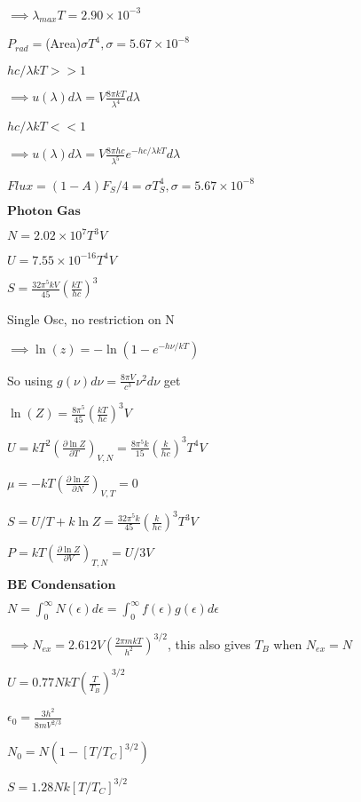 \documentclass{article}
\begin{document}
\begin{multicols}{3}
$\implies \lambda_{max}T=2.90 \times 10^{-3}$

$P_{rad}=$(Area)$\sigma T^4, \sigma=5.67\times 10^{-8}$

$hc/\lambda kT >> 1$

$\implies u(\lambda)d\lambda=V\frac{8\pi kT}{\lambda^4}d\lambda$

$hc/\lambda kT << 1$

$\implies u(\lambda)d\lambda=V\frac{8\pi hc}{\lambda^5}e^{-hc/\lambda kT}d\lambda$

$Flux=(1-A)F_S/4=\sigma T_S^4, \sigma=5.67\times 10^{-8}$

$\textbf{Photon Gas}$

$N=2.02\times 10^7 T^3 V$

$U=7.55\times 10^{-16}T^4V$

$S=\frac{32\pi^5 kV}{45}\left ( \frac{kT}{hc} \right ) ^3$

Single Osc, no restriction on N

$\implies \ln(z)=-\ln(1-e^{-h\nu / kT})$

So using $g(\nu)d\nu=\frac{8\pi V}{c^3}\nu^2 d\nu$ get

$\ln(Z)=\frac{8\pi^5}{45} \left ( \frac{kT}{hc} \right )^3 V$

$U=kT^2 \left( \frac{\partial \ln Z}{\partial T} \right)_{V,N}=\frac{8 \pi^5 k}{15}\left(\frac{k}{hc}\right)^3 T^4 V$

$\mu=-kT \left( \frac{\partial \ln Z}{\partial N} \right)_{V,T}=0$

$S=U/T+k \ln Z=\frac{32 \pi^5 k}{45}\left(\frac{k}{hc}\right)^3 T^3 V$

$P=kT \left( \frac{\partial \ln Z}{\partial V} \right)_{T,N}=U/3V$

$\textbf{BE Condensation}$

$N=\int_0^\infty N(\epsilon)d\epsilon = \int_0^\infty f(\epsilon)g(\epsilon)d\epsilon$

$\implies N_{ex}=2.612 V \left ( \frac{2\pi mkT}{h^2} \right )^{3/2}$, this also gives $T_B$ when $N_{ex}=N$

$U=0.77 NkT \left ( \frac{T}{T_B}  \right )^{3/2}$

$\epsilon_0=\frac{3h^2}{8mV^{2/3}}$

$N_0=N(1-[T/T_C]^{3/2})$

$S=1.28Nk[T/T_C]^{3/2}$

\end{multicols}
\end{document}
